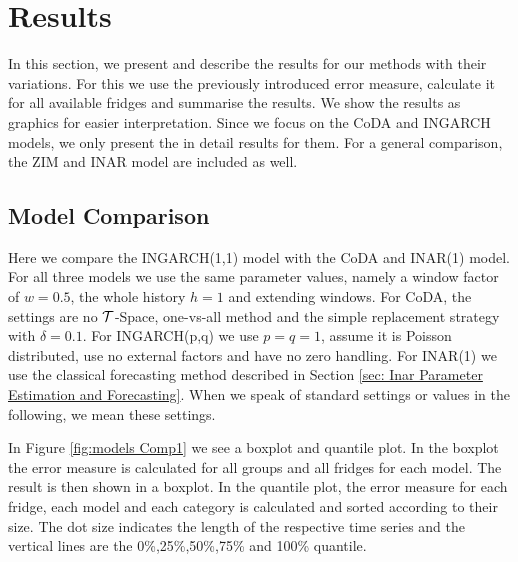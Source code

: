 \section{Results}
\label{sec:Results}

In this section, we present and describe the results for our methods with their variations. For this we use the previously introduced error measure, calculate it for all available fridges and summarise the results. We show the results as graphics for easier interpretation. Since we focus on the CoDA and INGARCH models, we only present the in detail results for them. For a general comparison, the ZIM and INAR model are included as well. 

\subsection{Model Comparison}
\label{sec: Model Comparison}

Here we compare the INGARCH(1,1) model with the CoDA and INAR(1) model. For all three models we use the same parameter values, namely a window factor of $w=0.5$, the whole history $h=1$ and extending windows. For CoDA, the settings are no $\mathcal{T}$-Space, one-vs-all method and the simple replacement strategy with $\delta=0.1$. For INGARCH(p,q) we use $p=q=1$, assume it is Poisson distributed, use no external factors and have no zero handling. For INAR(1) we use the classical forecasting method described in Section \ref{sec: Inar Parameter Estimation and Forecasting}. When we speak of standard settings or values in the following, we mean these settings. 

In Figure \ref{fig:models Comp1} we see a boxplot and quantile plot. In the boxplot the error measure is calculated for all groups and all fridges for each model. The result is then shown in a boxplot. In the quantile plot, the error measure for each fridge, each model and each category is calculated and sorted according to their size. The dot size indicates the length of the respective time series and the vertical lines are the 0\%,25\%,50\%,75\% and 100\% quantile.

